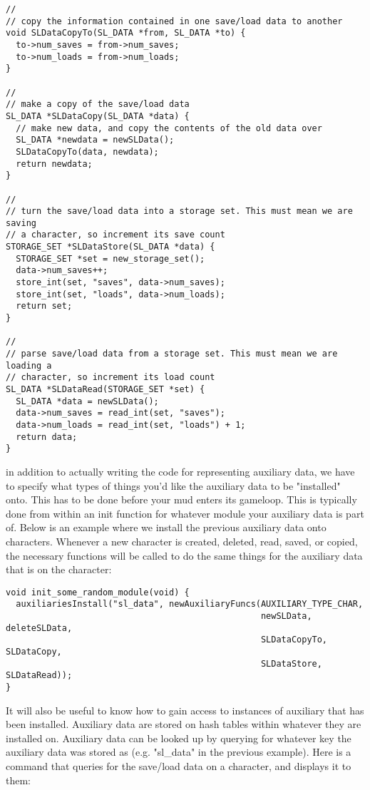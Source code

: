 \documentclass[fignum,doc]{article}
\begin{document}
\begin{doublespace}
\begin{singlespace}
\begin{verbatim}
//
// copy the information contained in one save/load data to another
void SLDataCopyTo(SL_DATA *from, SL_DATA *to) {
  to->num_saves = from->num_saves;
  to->num_loads = from->num_loads;
}

//
// make a copy of the save/load data
SL_DATA *SLDataCopy(SL_DATA *data) {
  // make new data, and copy the contents of the old data over
  SL_DATA *newdata = newSLData();
  SLDataCopyTo(data, newdata);
  return newdata;
}

//
// turn the save/load data into a storage set. This must mean we are saving
// a character, so increment its save count
STORAGE_SET *SLDataStore(SL_DATA *data) {
  STORAGE_SET *set = new_storage_set();
  data->num_saves++;
  store_int(set, "saves", data->num_saves);
  store_int(set, "loads", data->num_loads);
  return set;
}

//
// parse save/load data from a storage set. This must mean we are loading a
// character, so increment its load count
SL_DATA *SLDataRead(STORAGE_SET *set) {
  SL_DATA *data = newSLData();
  data->num_saves = read_int(set, "saves");
  data->num_loads = read_int(set, "loads") + 1;
  return data;
}
\end{verbatim} \end{singlespace}

\noindent in addition to actually writing the code for representing auxiliary data, we have to specify what types of things you'd like the auxiliary data to be "installed" onto. This has to be done before your mud enters its gameloop. This is typically done from within an init function for whatever module your auxiliary data is part of. Below is an example where we install the previous auxiliary data onto characters. Whenever a new character is created, deleted, read, saved, or copied, the necessary functions will be called to do the same things for the auxiliary data that is on the character:

\begin{singlespace} \begin{verbatim}
void init_some_random_module(void) {
  auxiliariesInstall("sl_data", newAuxiliaryFuncs(AUXILIARY_TYPE_CHAR,
                                                  newSLData, deleteSLData,
                                                  SLDataCopyTo, SLDataCopy,
                                                  SLDataStore, SLDataRead));
}
\end{verbatim} \end{singlespace}

\noindent It will also be useful to know how to gain access to instances of auxiliary that has been installed. Auxiliary data are stored on hash tables within whatever they are installed on. Auxiliary data can be looked up by querying for whatever key the auxiliary data was stored as (e.g. "sl\_data" in the previous example). Here is a command that queries for the save/load data on a character, and displays it to them:


\end{doublespace}
\end{document}

